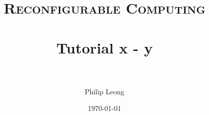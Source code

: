 \documentclass[paper=a4, fontsize=11pt]{scrartcl} %
\title{	
\normalfont \normalsize 
\textsc{Reconfigurable Computing} \\ [25pt] %
\horrule{0.5pt} \\[0.4cm] %
\huge Tutorial x - y \\ %
\horrule{2pt} \\[0.5cm] %
}
\author{Philip Leong} %
\date{\normalsize\today} %
\begin{document}
\maketitle %




{}

\end{document}
